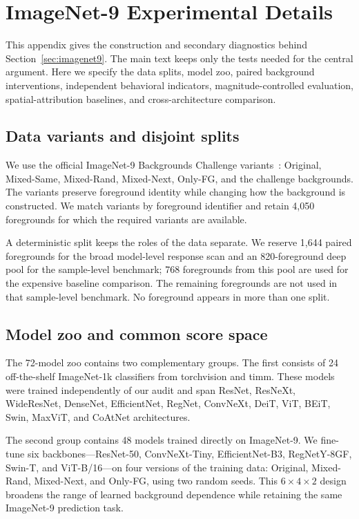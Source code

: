 \section{ImageNet-9 Experimental Details}
\label{app:imagenet9-setup}

This appendix gives the construction and secondary diagnostics behind Section~\ref{sec:imagenet9}. The main text keeps only the tests needed for the central argument. Here we specify the data splits, model zoo, paired background interventions, independent behavioral indicators, magnitude-controlled evaluation, spatial-attribution baselines, and cross-architecture comparison.

\subsection{Data variants and disjoint splits}

We use the official ImageNet-9 Backgrounds Challenge variants~\citep{xiao2021noise}: Original, Mixed-Same, Mixed-Rand, Mixed-Next, Only-FG, and the challenge backgrounds. The variants preserve foreground identity while changing how the background is constructed. We match variants by foreground identifier and retain 4,050 foregrounds for which the required variants are available.

A deterministic split keeps the roles of the data separate. We reserve 1,644 paired foregrounds for the broad model-level response scan and an 820-foreground deep pool for the sample-level benchmark; 768 foregrounds from this pool are used for the expensive baseline comparison. The remaining foregrounds are not used in that sample-level benchmark. No foreground appears in more than one split.

\subsection{Model zoo and common score space}

The 72-model zoo contains two complementary groups. The first consists of 24 off-the-shelf ImageNet-1k classifiers from torchvision and timm. These models were trained independently of our audit and span ResNet, ResNeXt, WideResNet, DenseNet, EfficientNet, RegNet, ConvNeXt, DeiT, ViT, BEiT, Swin, MaxViT, and CoAtNet architectures.

The second group contains 48 models trained directly on ImageNet-9. We fine-tune six backbones---ResNet-50, ConvNeXt-Tiny, EfficientNet-B3, RegNetY-8GF, Swin-T, and ViT-B/16---on four versions of the training data: Original, Mixed-Rand, Mixed-Next, and Only-FG, using two random seeds. This $6\times4\times2$ design broadens the range of learned background dependence while retaining the same ImageNet-9 prediction task.

